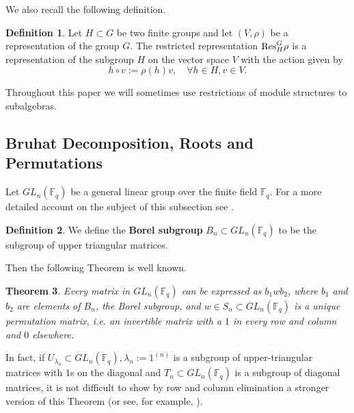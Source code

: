 \documentclass[12pt,reqno]{amsart}
\newtheorem{thm}{Theorem}[section]
\theoremstyle{definition}
\newtheorem{defn}[thm]{Definition}
\theoremstyle{remark}
\numberwithin{equation}{section}
\newcommand{\GL}[1]{GL_{#1}(\mathbb{F}_q)}
\begin{document}
We also recall the following definition.\\

\begin{defn}
    Let $H\subset G$ be two finite groups and let $(V,\rho)$ be a representation of the group $G$. The restricted representation ${\rm Res}_H^{G} \rho$ is a representation of the subgroup $H$ on the vector space $V$ with the action given by
    \begin{equation*}
        h\circ v:=\rho(h)v, \quad \forall h\in H, v\in V.
    \end{equation*}
\end{defn}

Throughout this paper we will sometimes use restrictions of module structures to subalgebras.

\subsection{Bruhat Decomposition, Roots and Permutations}


Let $GL_n(\mathbb{F}_q)$ be a general linear group over the finite field $\mathbb{F}_q$. For a more detailed account on the subject of this subsection see \cite{DB}.

\begin{defn}
    We define the \textbf{Borel subgroup} $B_n \subset \GL{n}$ to be the subgroup of upper triangular matrices.
\end{defn}
Then the following Theorem is well known.

\begin{thm}\label{bruhat}
    Every matrix in $GL_n (\mathbb{F}_q)$ can be expressed as $b_1wb_2$, where $b_1$ and $b_2$ are elements of $B_n$, the Borel subgroup, and $w\in S_n \subset \GL{n}$ is a unique permutation matrix, i.e. an invertible matrix with a $1$ in every row and column and $0$ elsewhere.
\end{thm}\label{unipotent_Bruhat}
In fact, if $U_{\lambda_n}\subset \GL{n},\lambda_n:=1^{(n)}$ is a subgroup of upper-triangular matrices with $1$s on the diagonal and $T_n\subset \GL{n}$ is a subgroup of diagonal matrices, it is not difficult to show by row and column elimination a stronger version of this Theorem (or see, for example, \cite[Theorem 4]{St}).
\end{document}
